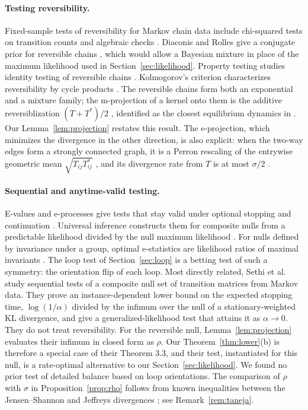 \documentclass[11pt]{article}
\theoremstyle{definition}
\theoremstyle{remark}
\begin{document}
\paragraph{Testing reversibility.} Fixed-sample tests of reversibility for Markov chain data include chi-squared tests on transition counts \cite{steuber2012} and algebraic checks \cite{jiang2018}. Diaconis and Rolles give a conjugate prior for reversible chains \cite{diaconisrolles2006}, which would allow a Bayesian mixture in place of the maximum likelihood used in Section~\ref{sec:likelihood}. Property testing studies identity testing of reversible chains \cite{friedwolfer2022}. Kolmogorov's criterion characterizes reversibility by cycle products \cite{kelly1979}. The reversible chains form both an exponential and a mixture family; the m-projection of a kernel onto them is the additive reversiblization $(T+T^\ast)/2$ \cite{wolfer2021,fill1991}, identified as the closest equilibrium dynamics in \cite{andrieux2025}. Our Lemma~\ref{lem:projection} restates this result. The e-projection, which minimizes the divergence in the other direction, is also explicit: when the two-way edges form a strongly connected graph, it is a Perron rescaling of the entrywise geometric mean $\sqrt{T_{ij}T^\ast_{ij}}$ \cite[Thm.~6.1]{wolfer2021}, and its divergence rate from $T$ is at most $\sigma/2$ \cite{andrieux2025}.

\paragraph{Sequential and anytime-valid testing.} E-values and e-processes give tests that stay valid under optional stopping and continuation \cite{grunwald2024,ramdas2023}. Universal inference constructs them for composite nulls from a predictable likelihood divided by the null maximum likelihood \cite{wasserman2020}. For nulls defined by invariance under a group, optimal e-statistics are likelihood ratios of maximal invariants \cite{perezortiz2024,koning2023}. The loop test of Section~\ref{sec:loop} is a betting test of such a symmetry: the orientation flip of each loop. Most directly related, Sethi et al.\ \cite{sethi2026} study sequential tests of a composite null set of transition matrices from Markov data. They prove an instance-dependent lower bound on the expected stopping time, $\log(1/\alpha)$ divided by the infimum over the null of a stationary-weighted KL divergence, and give a generalized-likelihood test that attains it as $\alpha\to0$. They do not treat reversibility. For the reversible null, Lemma~\ref{lem:projection} evaluates their infimum in closed form as $\rho$. Our Theorem~\ref{thm:lower}(b) is therefore a special case of their Theorem 3.3, and their test, instantiated for this null, is a rate-optimal alternative to our Section~\ref{sec:likelihood}. We found no prior test of detailed balance based on loop orientations. The comparison of $\rho$ with $\sigma$ in Proposition~\ref{prop:rho} follows from known inequalities between the Jensen--Shannon and Jeffreys divergences \cite{taneja2005,crooks2008}; see Remark~\ref{rem:taneja}.
\end{document}
